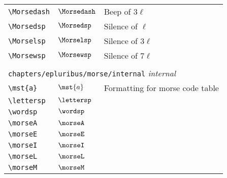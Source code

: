 \begin{longtable}{lll}
  {\color[rgb]{0.5,0.5,0.5}\texttt{\textbackslash Morsedash}}                                               & $\Morsedash$               & Beep of $3\ell$\\
  {\color[rgb]{0.5,0.5,0.5}\texttt{\textbackslash Morsedsp}}                                                & $\Morsedsp$                & Silence of $\ell$\\
  {\color[rgb]{0.5,0.5,0.5}\texttt{\textbackslash Morselsp}}                                                & $\Morselsp$                & Silence of $3\ell$\\
  {\color[rgb]{0.5,0.5,0.5}\texttt{\textbackslash Morsewsp}}                                                & $\Morsewsp$                & Silence of $7\ell$                                      \\
  &                            &                                                         \\
  \multicolumn{3}{l}{{\color[rgb]{0.5,0.5,0.5}\texttt{chapters/epluribus/morse/internal}} \emph{internal}}
  \\
  \hline
  {\color[rgb]{0.5,0.5,0.5}\texttt{\textbackslash mst\{a\}}}                                                & $\mst{a}$                  & Formatting for morse code table\\
  {\color[rgb]{0.5,0.5,0.5}\texttt{\textbackslash lettersp}}                                                & $\lettersp$                & \\
  {\color[rgb]{0.5,0.5,0.5}\texttt{\textbackslash wordsp}}                                                  & $\wordsp$                  & \\
  {\color[rgb]{0.5,0.5,0.5}\texttt{\textbackslash morseA}}                                                  & $\morseA$                  & \\
  {\color[rgb]{0.5,0.5,0.5}\texttt{\textbackslash morseE}}                                                  & $\morseE$                  & \\
  {\color[rgb]{0.5,0.5,0.5}\texttt{\textbackslash morseI}}                                                  & $\morseI$                  & \\
  {\color[rgb]{0.5,0.5,0.5}\texttt{\textbackslash morseL}}                                                  & $\morseL$                  & \\
  {\color[rgb]{0.5,0.5,0.5}\texttt{\textbackslash morseM}}                                                  & $\morseM$                  & \\

\end{longtable}
